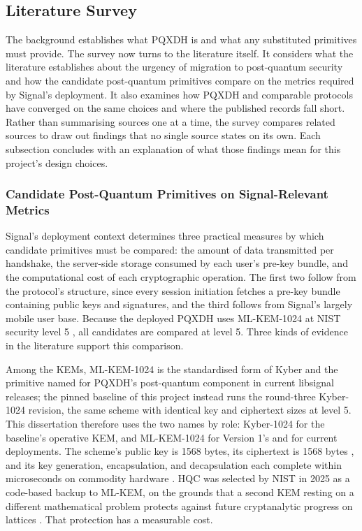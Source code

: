 \subsection{Literature Survey}
\label{subsec:literature-survey}

The background establishes what PQXDH is and what any substituted primitives must provide. The survey now turns to the literature itself. It considers what the literature establishes about the urgency of migration to post-quantum security and how the candidate post-quantum primitives compare on the metrics required by Signal's deployment. It also examines how PQXDH and comparable protocols have converged on the same choices and where the published records fall short. Rather than summarising sources one at a time, the survey compares related sources to draw out findings that no single source states on its own. Each subsection concludes with an explanation of what those findings mean for this project's design choices.

\subsubsection{Candidate Post-Quantum Primitives on Signal-Relevant Metrics}
\label{subsubsec:lit-primitives}

Signal's deployment context determines three practical measures by which candidate primitives must be compared: the amount of data transmitted per handshake, the server-side storage consumed by each user's pre-key bundle, and the computational cost of each cryptographic operation. The first two follow from the protocol's structure, since every session initiation fetches a pre-key bundle containing public keys and signatures, and the third follows from Signal's largely mobile user base. Because the deployed PQXDH uses ML-KEM-1024 at NIST security level 5 \cite{kret_pqxdh_nodate}, all candidates are compared at level 5. Three kinds of evidence in the literature support this comparison.

Among the KEMs, ML-KEM-1024 is the standardised form of Kyber and the primitive named for PQXDH's post-quantum component in current libsignal releases; the pinned baseline of this project instead runs the round-three Kyber-1024 revision, the same scheme with identical key and ciphertext sizes at level 5. This dissertation therefore uses the two names by role: Kyber-1024 for the baseline's operative KEM, and ML-KEM-1024 for Version 1's and for current deployments. The scheme's public key is 1568 bytes, its ciphertext is 1568 bytes \cite{national_institute_of_standards_and_technology_us_module-lattice-based_2024-1}, and its key generation, encapsulation, and decapsulation each complete within microseconds on commodity hardware \cite{open_quantum_safe_project_benchmarking_nodate}. HQC was selected by NIST in 2025 as a code-based backup to ML-KEM, on the grounds that a second KEM resting on a different mathematical problem protects against future cryptanalytic progress on lattices \cite{alagic_status_2025}. That protection has a measurable cost.

